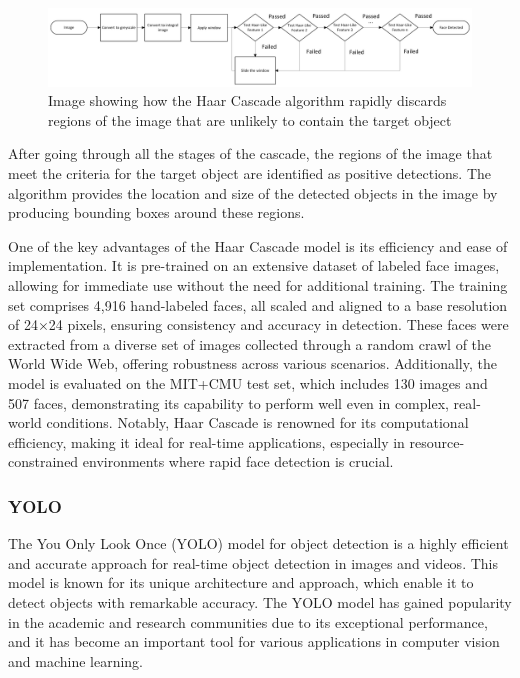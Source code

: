 \begin{figure}[!htb]
    \centering{}
    \includegraphics[scale=0.25]{m+m_images/HaarCascadeDesign.png}
    \caption{Image showing how the Haar Cascade algorithm rapidly discards regions of the image that are unlikely to contain the target object}
    \label{figure:haardesign}
\end{figure}

After going through all the stages of the cascade, the regions of the image that meet the criteria for the target object are identified as positive detections. The algorithm provides the location and size of the detected objects in the image by producing bounding boxes around these regions.

One of the key advantages of the Haar Cascade model is its efficiency and ease of implementation. It is pre-trained on an extensive dataset of labeled face images, allowing for immediate use without the need for additional training. The training set comprises 4,916 hand-labeled faces, all scaled and aligned to a base resolution of 24\(\times\)24 pixels, ensuring consistency and accuracy in detection. These faces were extracted from a diverse set of images collected through a random crawl of the World Wide Web, offering robustness across various scenarios. Additionally, the model is evaluated on the MIT+CMU test set, which includes 130 images and 507 faces, demonstrating its capability to perform well even in complex, real-world conditions. Notably, Haar Cascade is renowned for its computational efficiency, making it ideal for real-time applications, especially in resource-constrained environments where rapid face detection is crucial.

\subsubsection{YOLO}

The You Only Look Once (YOLO) model for object detection is a highly efficient and accurate approach for real-time object detection in images and videos. This model is known for its unique architecture and approach, which enable it to detect objects with remarkable accuracy. The YOLO model has gained popularity in the academic and research communities due to its exceptional performance, and it has become an important tool for various applications in computer vision and machine learning.

